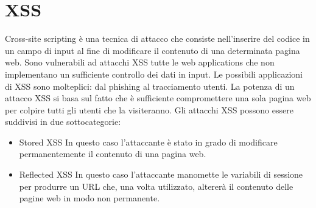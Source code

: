 \documentclass[a4paper,openright,italian]{article}
\begin{document}
\section{XSS}
Cross-site scripting \`e una tecnica di attacco che consiste nell'inserire del codice in un campo di input al fine di modificare il contenuto di una determinata pagina web. Sono vulnerabili ad attacchi XSS tutte le web applications che non implementano un sufficiente controllo dei dati in input. Le possibili applicazioni di XSS sono molteplici: dal phishing al tracciamento utenti. La potenza di un attacco XSS si basa sul fatto che \`e sufficiente compromettere una sola pagina web per colpire tutti gli utenti che la visiteranno.
\newline Gli attacchi XSS possono essere suddivisi in due sottocategorie:
\begin{itemize}
\item Stored XSS
\newline In questo caso l'attaccante \`e stato in grado di modificare permanentemente il contenuto di una pagina web.
\item Reflected XSS
\newline In questo caso l'attaccante manomette le variabili di sessione per produrre un URL che, una volta utilizzato, alterer\`a il contenuto delle pagine web in modo non permanente.
\end{itemize}
\end{document}

